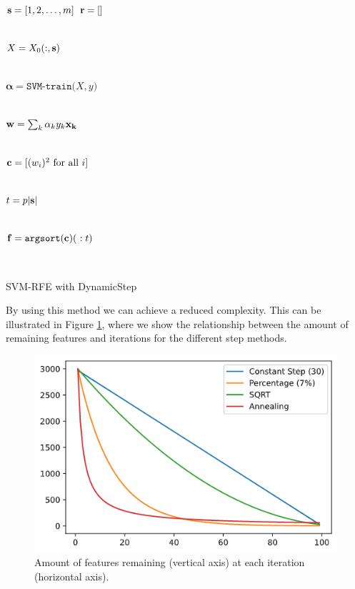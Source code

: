 \begin{algorithm}[h]
    \DontPrintSemicolon
      $\mathbf{s} = [1,2, \dotsc, m]$ 
      $\mathbf{r} = []$  
        {
            \\
            $X=X_0(:,\mathbf{s})$\VS

            \\
            $\boldsymbol{\alpha} = \texttt{SVM-train(} X, y \texttt{)}$\VS

            \\
            $\mathbf{w} = \sum_k{\alpha_k y_k \mathbf{x_k}}$\VS

            \\
            $\mathbf{c} = [(w_i)^2 \text{ for all $i$}]$\VS

            \\
            $t = p|\mathbf{s}|$\VS

            \\
            $\vt{f} = \texttt{argsort}(\vt{c})(\ :t)$\VS

            \\
        }
    \caption{SVM-RFE with DynamicStep}
\end{algorithm}
\VS
By using this method we can achieve a reduced complexity. This can be il\-lus\-trat\-ed in Figure \ref{fig:ch5.dstep.comparetime}, where we show the relationship between the amount of remaining features and iterations for the different step methods. 

\begin{figure}[h]
    \centering
    \includegraphics[width=0.4\linewidth]{img/ch5/comparetimes.png}
    \caption[Dynamic step: Comparison of methods]{Amount of features remaining (vertical axis) at each iteration (horizontal axis).}
    \label{fig:ch5.dstep.comparetime}
\end{figure}

